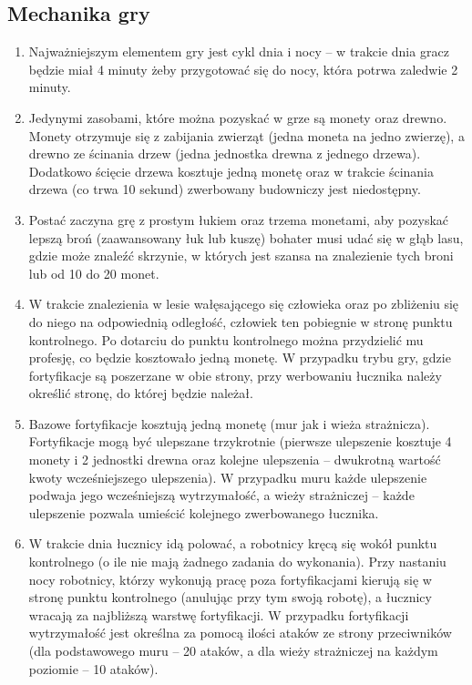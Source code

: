 \documentclass[12pt, a4paper]{article}
\begin{document}
\subsection{Mechanika gry}
\begin{enumerate}
\item Najważniejszym elementem gry jest cykl dnia i nocy -- w trakcie dnia 
gracz będzie miał 4 minuty żeby przygotować się do nocy, która potrwa 
zaledwie 2 minuty.
\item Jedynymi zasobami, które można pozyskać w grze są monety oraz drewno. 
Monety otrzymuje się z zabijania zwierząt (jedna moneta na jedno zwierzę), a 
drewno ze ścinania drzew (jedna jednostka drewna z jednego drzewa). Dodatkowo 
ścięcie drzewa kosztuje jedną monetę oraz w trakcie ścinania drzewa (co trwa 
10 sekund) zwerbowany budowniczy jest niedostępny.
\item Postać zaczyna grę z prostym łukiem oraz trzema monetami, aby pozyskać 
lepszą broń (zaawansowany łuk lub kuszę) bohater musi udać się w głąb lasu, 
gdzie może znaleźć skrzynie, w których jest szansa na znalezienie tych broni 
lub od 10 do 20 monet.
\item W trakcie znalezienia w lesie wałęsającego się człowieka oraz po 
zbliżeniu się do niego na odpowiednią odległość, człowiek ten pobiegnie w 
stronę punktu kontrolnego. Po dotarciu do punktu kontrolnego można 
przydzielić mu profesję, co będzie kosztowało jedną monetę. W przypadku trybu 
gry, gdzie fortyfikacje są poszerzane w obie strony, przy werbowaniu łucznika 
należy określić stronę, do której będzie należał.
\item Bazowe fortyfikacje kosztują jedną monetę (mur jak i wieża strażnicza). 
Fortyfikacje mogą być ulepszane trzykrotnie (pierwsze ulepszenie kosztuje 4 
monety i 2 jednostki drewna oraz kolejne ulepszenia -- dwukrotną wartość 
kwoty wcześniejszego ulepszenia). W przypadku muru każde ulepszenie podwaja 
jego wcześniejszą wytrzymałość, a wieży strażniczej -- każde ulepszenie 
pozwala umieścić kolejnego zwerbowanego łucznika.
\item W trakcie dnia łucznicy idą polować, a robotnicy kręcą się wokół punktu 
kontrolnego (o ile nie mają żadnego zadania do wykonania). Przy nastaniu nocy 
robotnicy, którzy wykonują pracę poza fortyfikacjami kierują się w stronę 
punktu kontrolnego (anulując przy tym swoją robotę), a łucznicy wracają za 
najbliższą warstwę fortyfikacji. W przypadku fortyfikacji wytrzymałość jest 
określna za pomocą ilości ataków ze strony przeciwników (dla podstawowego 
muru -- 20 ataków, a dla wieży strażniczej na każdym poziomie -- 10 ataków).

\end{enumerate}
\end{document}
